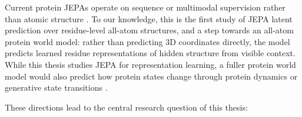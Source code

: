 Current protein JEPAs operate on sequence or multimodal supervision rather than atomic structure \citep{ofer2026proteinjepa,ravideshik2026protjepa}. To our knowledge, this is the first study of JEPA latent prediction over residue-level all-atom structures, and a step towards an all-atom protein world model: rather than predicting 3D coordinates directly, the model predicts learned residue representations of hidden structure from visible context. While this thesis studies JEPA for representation learning, a fuller protein world model would also predict how protein states change through protein dynamics or generative state transitions \citep{maes2026leworldmodel}.

These directions lead to the central research question of this thesis:


